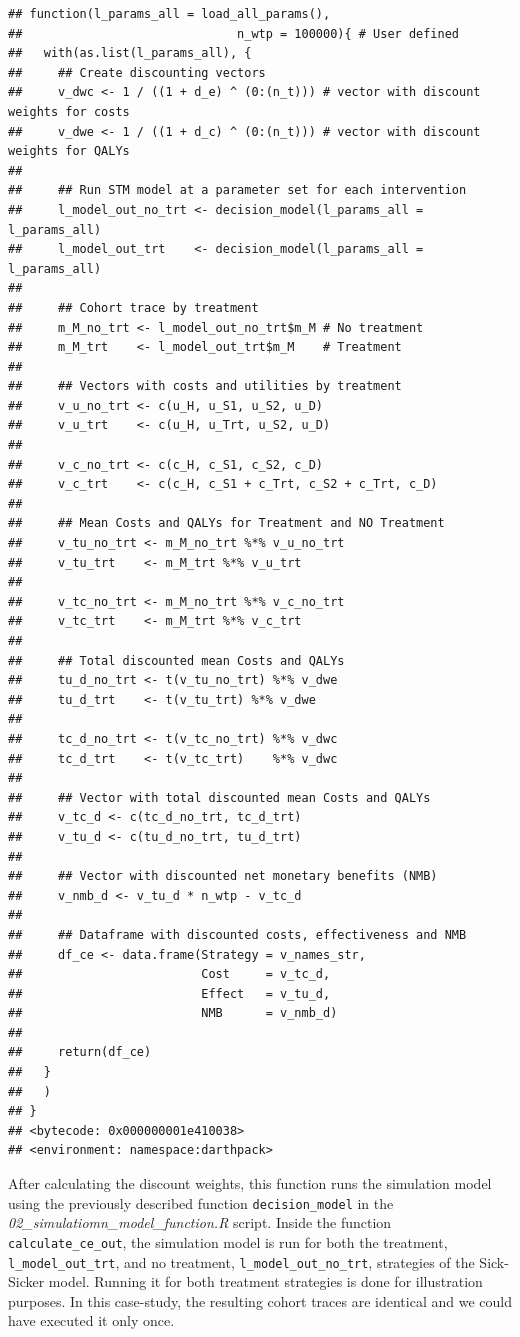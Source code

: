 \documentclass[]{book}
\begin{document}
\begin{verbatim}
## function(l_params_all = load_all_params(), 
##                              n_wtp = 100000){ # User defined
##   with(as.list(l_params_all), {
##     ## Create discounting vectors
##     v_dwc <- 1 / ((1 + d_e) ^ (0:(n_t))) # vector with discount weights for costs
##     v_dwe <- 1 / ((1 + d_c) ^ (0:(n_t))) # vector with discount weights for QALYs
##     
##     ## Run STM model at a parameter set for each intervention
##     l_model_out_no_trt <- decision_model(l_params_all = l_params_all)
##     l_model_out_trt    <- decision_model(l_params_all = l_params_all)
##     
##     ## Cohort trace by treatment
##     m_M_no_trt <- l_model_out_no_trt$m_M # No treatment
##     m_M_trt    <- l_model_out_trt$m_M    # Treatment
##     
##     ## Vectors with costs and utilities by treatment
##     v_u_no_trt <- c(u_H, u_S1, u_S2, u_D)
##     v_u_trt    <- c(u_H, u_Trt, u_S2, u_D)
##     
##     v_c_no_trt <- c(c_H, c_S1, c_S2, c_D)
##     v_c_trt    <- c(c_H, c_S1 + c_Trt, c_S2 + c_Trt, c_D)
##     
##     ## Mean Costs and QALYs for Treatment and NO Treatment
##     v_tu_no_trt <- m_M_no_trt %*% v_u_no_trt
##     v_tu_trt    <- m_M_trt %*% v_u_trt
##     
##     v_tc_no_trt <- m_M_no_trt %*% v_c_no_trt
##     v_tc_trt    <- m_M_trt %*% v_c_trt
##     
##     ## Total discounted mean Costs and QALYs
##     tu_d_no_trt <- t(v_tu_no_trt) %*% v_dwe 
##     tu_d_trt    <- t(v_tu_trt) %*% v_dwe
##     
##     tc_d_no_trt <- t(v_tc_no_trt) %*% v_dwc
##     tc_d_trt    <- t(v_tc_trt)    %*% v_dwc
##     
##     ## Vector with total discounted mean Costs and QALYs
##     v_tc_d <- c(tc_d_no_trt, tc_d_trt)
##     v_tu_d <- c(tu_d_no_trt, tu_d_trt)
##     
##     ## Vector with discounted net monetary benefits (NMB)
##     v_nmb_d <- v_tu_d * n_wtp - v_tc_d
##     
##     ## Dataframe with discounted costs, effectiveness and NMB
##     df_ce <- data.frame(Strategy = v_names_str,
##                         Cost     = v_tc_d,
##                         Effect   = v_tu_d,
##                         NMB      = v_nmb_d)
##     
##     return(df_ce)
##   }
##   )
## }
## <bytecode: 0x000000001e410038>
## <environment: namespace:darthpack>
\end{verbatim}

After calculating the discount weights, this function runs the simulation model using the previously described function \texttt{decision\_model} in the \emph{02\_simulatiomn\_model\_function.R} script. Inside the function \texttt{calculate\_ce\_out}, the simulation model is run for both the treatment, \texttt{l\_model\_out\_trt}, and no treatment, \texttt{l\_model\_out\_no\_trt}, strategies of the Sick-Sicker model. Running it for both treatment strategies is done for illustration purposes. In this case-study, the resulting cohort traces are identical and we could have executed it only once.
\end{document}
